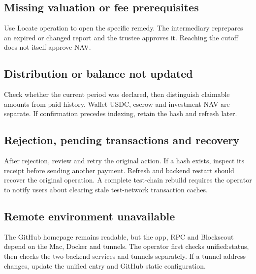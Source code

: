 \documentclass[12pt,a4paper]{article}
\begin{document}
\subsection{Missing valuation or fee prerequisites}
Use Locate operation to open the specific remedy. The intermediary reprepares an expired or changed report and the trustee approves it. Reaching the cutoff does not itself approve NAV.

\subsection{Distribution or balance not updated}
Check whether the current period was declared, then distinguish claimable amounts from paid history. Wallet USDC, escrow and investment NAV are separate. If confirmation precedes indexing, retain the hash and refresh later.

\subsection{Rejection, pending transactions and recovery}
After rejection, review and retry the original action. If a hash exists, inspect its receipt before sending another payment. Refresh and backend restart should recover the original operation. A complete test-chain rebuild requires the operator to notify users about clearing stale test-network transaction caches.

\subsection{Remote environment unavailable}
The GitHub homepage remains readable, but the app, RPC and Blockscout depend on the Mac, Docker and tunnels. The operator first checks unified:status, then checks the two backend services and tunnels separately. If a tunnel address changes, update the unified entry and GitHub static configuration.
\end{document}
